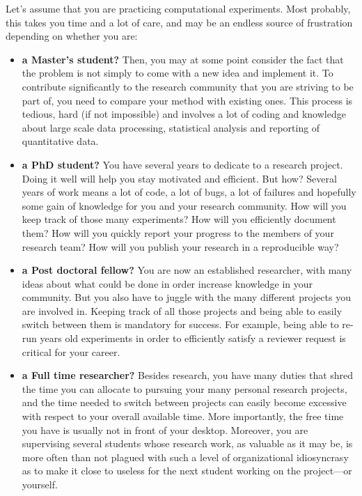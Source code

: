 \documentclass[a4paper,fleqn]{tufte-handout}
\begin{document}
Let's assume that you are practicing computational experiments. Most probably, this takes you time and a lot of care, and may be an endless source of frustration depending on whether you are:
\begin{itemize}
\item  \textbf{a Master's student?} Then, you may at some point consider the fact that the problem is not simply to come with a new idea and implement it. To contribute significantly to the research community that you are striving to be part of, you need to compare your method with existing ones. This process is tedious, hard (if not impossible) and involves a lot of coding and knowledge about large scale data processing, statistical analysis and reporting of quantitative data.

\item \textbf{a PhD student?} You have several years to dedicate to a research project. Doing it well will help you stay motivated and efficient. But how? Several years of work means a lot of code, a lot of bugs, a lot of failures and hopefully some gain of knowledge for you and your research community. How will you keep track of those many experiments? How will you efficiently document them?  How will you quickly report your progress to the members of your research team? How will you publish your research in a reproducible way?

\item \textbf{a Post doctoral fellow?} You are now an established researcher, with many ideas about what could be done in order increase knowledge in your community. But you also have to juggle with the many different projects you are involved in. Keeping track of all those projects and being able to easily switch between them is mandatory for success. For example, being able to re-run years old experiments in order to efficiently satisfy a reviewer request is critical for your career.

\item \textbf{a Full time researcher?} Besides research, you have many duties that shred the time you can allocate to pursuing your many personal research projects, and the time needed to switch between projects can easily become excessive with respect to your overall available time. More importantly, the free time you have is usually not in front of your desktop. Moreover, you are supervising several students whose research work, as valuable as it may be, is more often than not plagued with such a level of organizational idiosyncrasy as to make it close to useless for the next student working on the project---or yourself.

\end{itemize}
\end{document}
